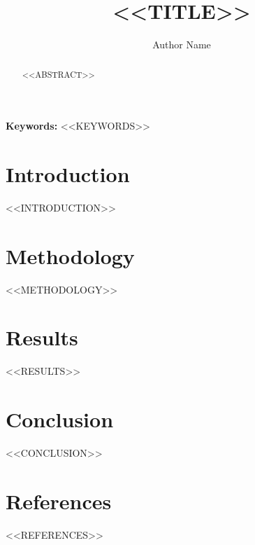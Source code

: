 \documentclass{article}
\title{<<TITLE>>}
\author{Author Name}
\date{}
\begin{document}
\maketitle

\begin{abstract}
<<ABSTRACT>>
\end{abstract}

\textbf{Keywords:} <<KEYWORDS>>

\section{Introduction}
<<INTRODUCTION>>

\section{Methodology}
<<METHODOLOGY>>

\section{Results}
<<RESULTS>>

\section{Conclusion}
<<CONCLUSION>>

\section*{References}
<<REFERENCES>>
\end{document}
